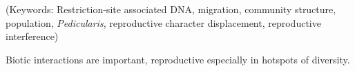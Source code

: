 \documentclass[12pt,letterpaper]{article}
\renewcommand{\section}[1]{%
\bigskip
\begin{center}
\begin{Large}
\normalfont\scshape #1
\medskip
\end{Large}
\end{center}}
\renewcommand{\subsection}[1]{%
\bigskip
\begin{center}
\begin{large}
\normalfont\itshape #1
\end{large}
\end{center}}
\begin{document}

\vspace{1in}

\noindent (Keywords: Restriction-site associated DNA, 
migration, community structure, population, \emph{Pedicularis}, 
reproductive character displacement, reproductive interference)\\

\vspace{1.5in}


\subsection*{Biotic interactions are important, reproductive especially in hotspots of diversity.}
\end{document}

